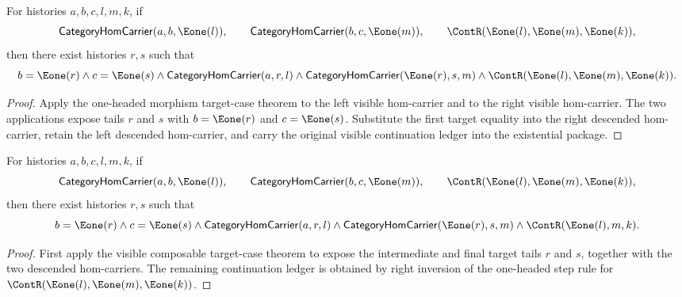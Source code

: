 \begin{theorem}
\label{thm:category-visible-composable-morphisms-target-cases}
For histories $a,b,c,l,m,k$, if
$$
\mathsf{CategoryHomCarrier}(a,b,\Eone(l)),\qquad
\mathsf{CategoryHomCarrier}(b,c,\Eone(m)),\qquad
\ContR(\Eone(l),\Eone(m),\Eone(k)),
$$
then there exist histories $r,s$ such that
$$
b=\Eone(r)\land c=\Eone(s)\land
\mathsf{CategoryHomCarrier}(a,r,l)\land
\mathsf{CategoryHomCarrier}(\Eone(r),s,m)\land
\ContR(\Eone(l),\Eone(m),\Eone(k)).
$$
\end{theorem}
\begin{proof}
Apply the one-headed morphism target-case theorem to the left visible
hom-carrier and to the right visible hom-carrier. The two applications expose
tails $r$ and $s$ with $b=\Eone(r)$ and $c=\Eone(s)$. Substitute the first
target equality into the right descended hom-carrier, retain the left
descended hom-carrier, and carry the original visible continuation ledger into
the existential package.
\end{proof}

\begin{theorem}
\label{thm:category-visible-composable-morphisms-tail-cases}
For histories $a,b,c,l,m,k$, if
$$
\mathsf{CategoryHomCarrier}(a,b,\Eone(l)),\qquad
\mathsf{CategoryHomCarrier}(b,c,\Eone(m)),\qquad
\ContR(\Eone(l),\Eone(m),\Eone(k)),
$$
then there exist histories $r,s$ such that
$$
b=\Eone(r)\land c=\Eone(s)\land
\mathsf{CategoryHomCarrier}(a,r,l)\land
\mathsf{CategoryHomCarrier}(\Eone(r),s,m)\land
\ContR(\Eone(l),m,k).
$$
\end{theorem}
\begin{proof}
First apply the visible composable target-case theorem to expose the
intermediate and final target tails $r$ and $s$, together with the two
descended hom-carriers. The remaining continuation ledger is obtained by
right inversion of the one-headed step rule for
$\ContR(\Eone(l),\Eone(m),\Eone(k))$.
\end{proof}

